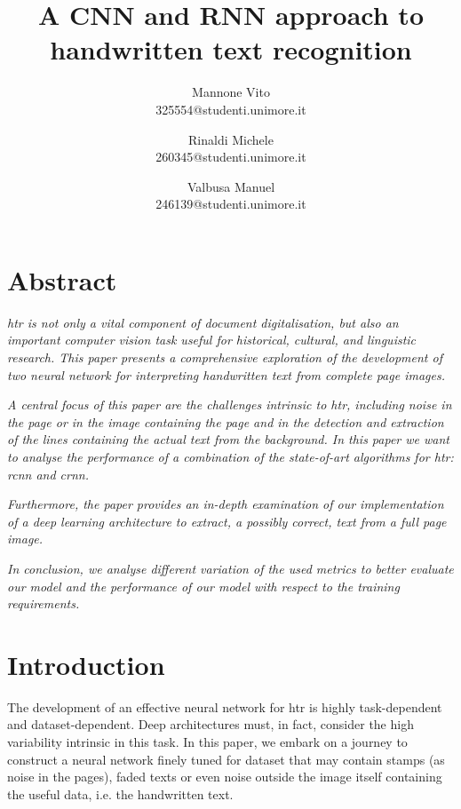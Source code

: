 \documentclass[10pt,twocolumn,letterpaper]{article}
\begin{document}
\title{A CNN and RNN approach to handwritten text recognition}

\author{Mannone Vito\\
325554@studenti.unimore.it
\and
Rinaldi Michele\\
260345@studenti.unimore.it
\and
Valbusa Manuel\\
246139@studenti.unimore.it
}

\maketitle

\section*{Abstract}
\textit{
\acrfull{htr} is not only a vital component of document digitalisation, but also an important computer vision task useful for historical, cultural, and linguistic research. This paper presents a comprehensive exploration of the development of two neural network for interpreting handwritten text from complete page images.
}

\textit{
A central focus of this paper are the challenges intrinsic to \acrshort{htr}, including noise in the page or in the image containing the page and in the detection and extraction of the lines containing the actual text from the background. In this paper we want to analyse the performance of a combination of the state-of-art algorithms for \acrshort{htr}: \acrshort{rcnn} and \acrshort{crnn}.
}

\textit{
Furthermore, the paper provides an in-depth examination of our implementation of a deep learning architecture to extract, a possibly correct, text from a full page image.
}

\textit{
In conclusion, we analyse different variation of the used metrics to better evaluate our model and the performance of our model with respect to the training requirements.
}

\section{Introduction}
The development of an effective neural network for \acrshort{htr} is highly task-dependent and dataset-dependent. Deep architectures must, in fact, consider the high variability intrinsic in this task. In this paper, we embark on a journey to construct a neural network finely tuned for dataset that may contain stamps (as noise in the pages), faded texts or even noise outside the image itself containing the useful data, i.e. the handwritten text.
\end{document}

